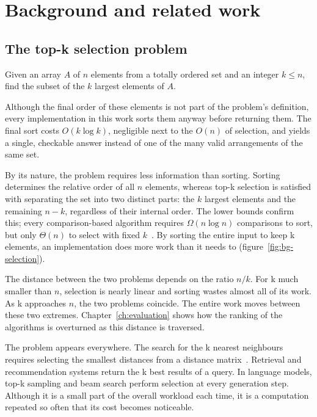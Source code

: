 \chapter{Background and related work}
\label{ch:background}

\section{The top-k selection problem}
\label{sec:bg-problem}

\begin{definition}
\label{def:topk}
Given an array $A$ of $n$ elements from a totally ordered set and an integer $k
\le n$, find the subset of the $k$ largest elements of $A$.
\end{definition}

Although the final order of these elements is not part of the problem's
definition, every implementation in this work sorts them anyway before
returning them. The final sort costs $O(k \log k)$, negligible next to the
$O(n)$ of selection, and yields a single, checkable answer instead of one of
the many valid arrangements of the same set.

By its nature, the problem requires less information than sorting. Sorting
determines the relative order of all $n$ elements, whereas top-k selection is
satisfied with separating the set into two distinct parts: the $k$ largest
elements and the remaining $n-k$, regardless of their internal order. The lower
bounds confirm this; every comparison-based algorithm requires $\Omega(n \log
n)$ comparisons to sort, but only $\Theta(n)$ to select with fixed
$k$~\cite{knuth1998}. By sorting the entire input to keep k elements, an
implementation does more work than it needs to (figure~\ref{fig:bg-selection}).



The distance between the two problems depends on the ratio $n/k$. For k much
smaller than $n$, selection is nearly linear and sorting wastes almost all of
its work. As k approaches $n$, the two problems coincide. The entire work moves
between these two extremes. Chapter~\ref{ch:evaluation} shows how the ranking
of the algorithms is overturned as this distance is traversed.

The problem appears everywhere. The search for the k nearest neighbours
requires selecting the smallest distances from a distance
matrix~\cite{sismanis2012}. Retrieval and recommendation systems return the k
best results of a query. In language models, top-k sampling and beam search
perform selection at every generation step. Although it is a small part of the
overall workload each time, it is a computation repeated so often that its cost
becomes noticeable.

